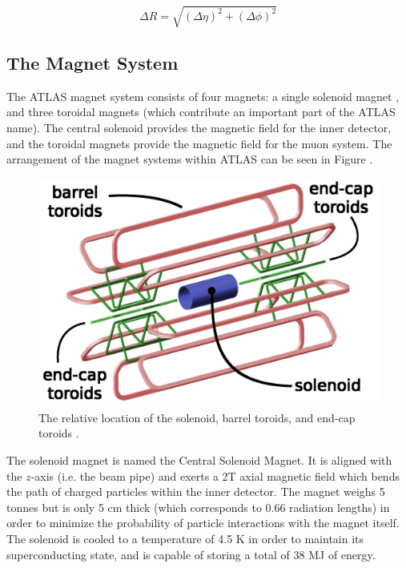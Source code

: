 \documentclass[12pt,a4paper,epsf,portrait,times,epsfig]{report}
\begin{document}
		\begin{equation}
			\Delta R = \sqrt{ (\Delta\eta)^{2} + (\Delta\phi)^{2} }
		\end{equation}


		\subsection{The Magnet System}\label{Section:Magnets}

		The ATLAS magnet system consists of four magnets: a single solenoid magnet \cite{ATLASSolenoidMagnet}, and three toroidal magnets \cite{ATLASBarrelToroid, ATLASEndcapToroid} (which contribute an important part of the ATLAS name). The central solenoid provides the magnetic field for the inner detector, and the toroidal magnets provide the magnetic field	for the muon system. The arrangement of the magnet systems within ATLAS can be seen in Figure . \par

		\begin{figure}
			\centering
			\includegraphics[scale=0.15]{Magnet_Layout.png}
			\caption{The relative location of the solenoid, barrel toroids, and end-cap toroids \cite{ATLASToroids}. }
			\label{Fig:CernMagneticLayout}
		\end{figure}

		The solenoid magnet is named the Central Solenoid Magnet. It is aligned with the $z$-axis (i.e. the beam pipe) and exerts a 2T axial magnetic field which bends the path of charged particles within the inner detector. The magnet weighs 5 tonnes but is only 5 cm thick (which corresponds to 0.66 radiation lengths) in order to minimize the probability of particle interactions with the magnet itself. The solenoid is cooled to a temperature of 4.5 K in order to maintain its superconducting state, and is capable of storing a total of 38 MJ of energy. \par
		
\end{document}
